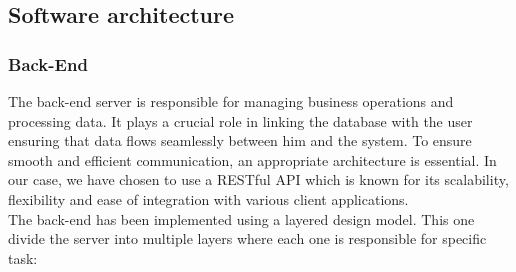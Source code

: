 \documentclass[12pt,a4paper,table,english]{article}
\begin{document}
	\pagebreak
	\subsection{Software architecture}
	
	\subsubsection{Back-End}
	
	The back-end server is responsible for managing business operations and processing data. It plays a crucial role in linking the database with the user ensuring that data flows seamlessly between him and the system. To ensure smooth and efficient communication, an appropriate architecture is essential. In our case, we have chosen to use a RESTful API which is known for its scalability, flexibility and ease of integration with various client applications.\\
	
	\noindent The back-end has been implemented using a layered design model. This one divide the server into multiple layers where each one is responsible for specific task: 
	
\end{document}
